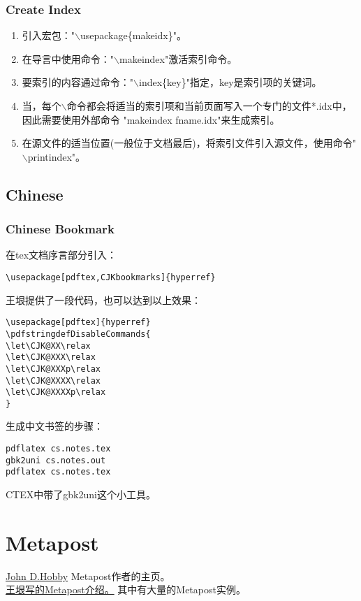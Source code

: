 \documentclass[a4paper,11pt,oneside,openany]{book}
\begin{document}
\begin{CJK*}{GBK}{song}
\subsection{Create Index}
\begin{enumerate}
\item 引入宏包："$\backslash$usepackage\{makeidx\}"。
\item 在导言中使用命令："$\backslash$makeindex"激活索引命令。
\item 要索引的内容通过命令："$\backslash$index\{key\}"指定，key是索引项的关键词。
\item 当，每个$\backslash$命令都会将适当的索引项和当前页面写入一个专门的文件*.idx中，因此需要使用外部命令
"makeindex\label{latex-tools-makeindex} fname.idx"来生成索引。
\item 在源文件的适当位置(一般位于文档最后)，将索引文件引入源文件，使用命令"$\backslash$printindex"。
\end{enumerate}

\newpage
\section{Chinese}
\subsection{Chinese Bookmark}
在tex文档序言部分引入：
\begin{lstlisting}
\usepackage[pdftex,CJKbookmarks]{hyperref}
\end{lstlisting}

王垠提供了一段代码，也可以达到以上效果：
\begin{lstlisting}[language=TEX]
\usepackage[pdftex]{hyperref}
\pdfstringdefDisableCommands{
\let\CJK@XX\relax
\let\CJK@XXX\relax
\let\CJK@XXXp\relax
\let\CJK@XXXX\relax
\let\CJK@XXXXp\relax
}
\end{lstlisting}

生成中文书签的步骤：
\begin{lstlisting}
pdflatex cs.notes.tex
gbk2uni cs.notes.out
pdflatex cs.notes.tex
\end{lstlisting}

CTEX中带了gbk2uni这个小工具。


\chapter{Metapost}
\noindent\href{http://ect.bell-labs.com/who/hobby/index.shtml}{John D.Hobby} Metapost作者的主页。\\
\noindent\href{http://docs.huihoo.com/homepage/shredderyin/metapost.html}{王垠写的Metapost介绍。} 其中有大量的Metapost实例。\\


\end{CJK*}
\end{document}

